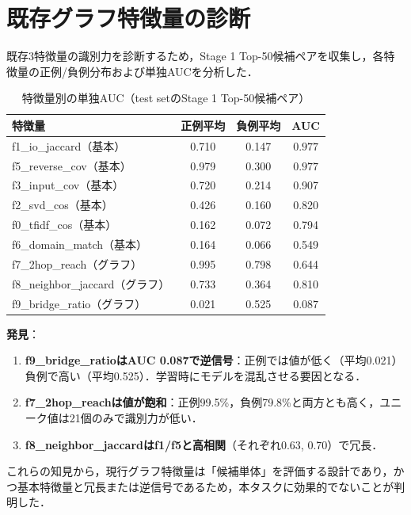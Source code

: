 \documentclass[11pt,a4paper]{ltjsarticle}
\begin{document}
\section{既存グラフ特徴量の診断}

既存3特徴量の識別力を診断するため，Stage 1 Top-50候補ペアを収集し，各特徴量の正例/負例分布および単独AUCを分析した．

\begin{table}[h]
\centering
\caption{特徴量別の単独AUC（test setのStage 1 Top-50候補ペア）}
\begin{tabular}{lccc}
\toprule
特徴量 & 正例平均 & 負例平均 & AUC \\
\midrule
f1\_io\_jaccard（基本） & 0.710 & 0.147 & $\mathbf{0.977}$ \\
f5\_reverse\_cov（基本） & 0.979 & 0.300 & $\mathbf{0.977}$ \\
f3\_input\_cov（基本） & 0.720 & 0.214 & 0.907 \\
f2\_svd\_cos（基本） & 0.426 & 0.160 & 0.820 \\
f0\_tfidf\_cos（基本） & 0.162 & 0.072 & 0.794 \\
f6\_domain\_match（基本） & 0.164 & 0.066 & 0.549 \\
\midrule
f7\_2hop\_reach（グラフ） & 0.995 & 0.798 & 0.644 \\
f8\_neighbor\_jaccard（グラフ） & 0.733 & 0.364 & 0.810 \\
f9\_bridge\_ratio（グラフ） & 0.021 & 0.525 & $\mathbf{0.087}$ \\
\bottomrule
\end{tabular}
\end{table}

\textbf{発見}：
\begin{enumerate}[leftmargin=2em, nosep]
  \item \textbf{f9\_bridge\_ratioはAUC 0.087で逆信号}：正例では値が低く（平均0.021）負例で高い（平均0.525）．学習時にモデルを混乱させる要因となる．
  \item \textbf{f7\_2hop\_reachは値が飽和}：正例99.5\%，負例79.8\%と両方とも高く，ユニーク値は21個のみで識別力が低い．
  \item \textbf{f8\_neighbor\_jaccardはf1/f5と高相関}（それぞれ0.63, 0.70）で冗長．
\end{enumerate}

これらの知見から，現行グラフ特徴量は「候補単体」を評価する設計であり，かつ基本特徴量と冗長または逆信号であるため，本タスクに効果的でないことが判明した．
\end{document}

